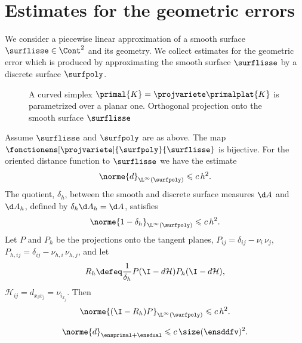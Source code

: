 \section{Estimates for the geometric errors {\cite[Sec. 4.2]{dziuk_finite_2013}}}

We consider a piecewise linear approximation of a smooth surface $\surflisse \in \Cont^2$ and its geometry. We collect estimates for the geometric error which is produced by approximating the smooth surface $\surflisse$ by a discrete surface $\surfpoly$. 

\begin{figure}[H]
    \centering
    
    \caption{A curved simplex $\primal{K} = \projvariete \primalplat{K}$ is parametrized over a planar one. Orthogonal projection onto the smooth surface $\surflisse$}
\end{figure}

\begin{lemme} \label{lemme:projection_dziuk}
Assume $\surflisse$ and $\surfpoly$ are as above. The map $\fonctionens[\projvariete]{\surfpoly}{\surflisse}$ is bijective. For the oriented distance function to $\surflisse$ we have the estimate
\[
\norme{d}_{\L^\infty(\surfpoly)} \leqslant c \, h^2.
\]
The quotient, $\delta_h$, between the smooth and discrete surface measures $\d A$ and $\d A_h$, defined by $\delta_h \d A_h = \d A$, satisfies
\[
\norme{1 - \delta_h}_{\L^\infty(\surfpoly)} \leqslant c \, h^2.
\]
Let $P$ and $P_h$ be the projections onto the tangent planes, $P_{ij} = \delta_{ij} - \nu_i \, \nu_j$, $P_{h,ij} = \delta_{ij} - \nu_{h,i} \, \nu_{h,j}$, and let
\[
R_h \defeq \frac{1}{\delta_h} P(\I - d\mathcal{H}) P_h (\I - d\mathcal{H}),
\]
$\mathcal{H}_{ij} = d_{x_i x_j} = \nu_{i_{x_j}}$. Then
\[
\norme{(\I - R_h) P}_{\L^\infty(\surfpoly)} \leqslant c \, h^2.
\]
\end{lemme}

\begin{lemme}
{\color{red}
\[
\norme{d}_{\ensprimal + \ensdual} \leqslant c \, \size(\ensddfv)^2.
\]
}
\end{lemme}

\begin{lemme}
\end{lemme}

